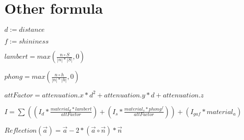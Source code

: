 \section{Other formula}
$d := distance$

$f := shininess$

$
    lambert
=
    max\left(
        \frac{
            n
            \circ
            S
        }{
            | n | * | S |
        }
        , 
        0
    \right)
$

$
    phong
=
    max\left(
        \frac{n \circ h}{|n| * |h|}
        ,
        0
    \right)
$

$
    attFactor = attenuation.x * d^2 + attenuation.y * d + attenuation.z
$

$
    I
=
    \sum{}^{}
    \left(
        \left(
            I_d
            *
            \frac{
                material_d
                *
                lambert
            }{
                attFactor
            }
        \right)
        +
        \left(
            I_s
            *
            \frac{
                material_s
                *
                phong^{f}
            }{
                attFactor
            }
        \right)
    \right)
    +
    \left(
        I_{gaf}
        *
        material_a
    \right)
$

$
    Reflection(\vec{a})
=
    \vec{a} - 2 * (\vec{a} \circ \vec{n}) * \vec{n}
$